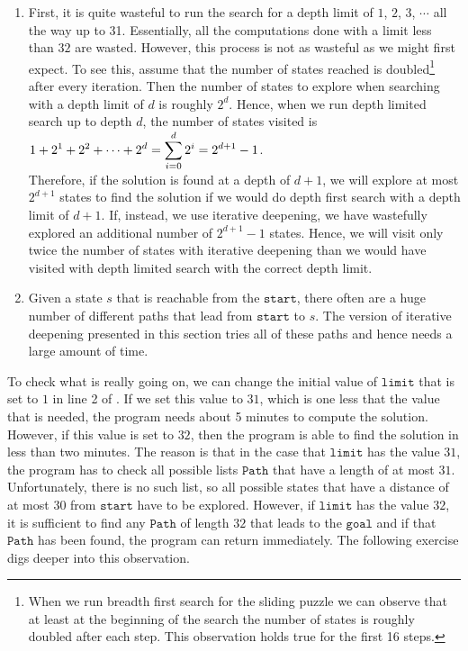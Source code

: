 \begin{enumerate}
\item First, it is quite wasteful to run the search for a depth limit of $1$, $2$, $3$, $\cdots$ all the way up
      to 31.  Essentially, all the computations done with a limit less than $32$ are wasted. However,
      this process is not as wasteful as we might first expect.  To see this, assume that the number of states
      reached is doubled\footnote{
        When we run breadth first search for the sliding puzzle we can observe that at least at the beginning
        of the search the number of states is roughly doubled after each step.  This observation holds true for
        the first 16 steps. 
      }
      after every iteration.  Then the number of states to explore when searching with a depth limit of $d$ is 
      roughly $2^d$.  Hence, when we run depth limited search up to depth $d$, the number of states visited is 
      \\[0.2cm]
      \hspace*{1.3cm}
      $\displaystyle 1 + 2^1 + 2^2 + \cdots + 2^d = \sum\limits_{i=0}^d 2^i = 2^{d+1} - 1$.
      \\[0.2cm]
      Therefore, if the solution is found at a depth of $d+1$, we will explore at most $2^{d+1}$ states to find
      the solution if we would do depth first search with a depth limit of $d+1$.  If, instead, we use
      iterative deepening, we have wastefully explored an additional number of $2^{d+1} -1$ states.  Hence, we
      will visit only twice the number of states with iterative deepening than we would have visited with depth
      limited search with the correct depth limit.
\item Given a state $s$ that is reachable from the $\texttt{start}$, there often are a huge number of
      different paths that lead from $\texttt{start}$ to $s$.  The version of iterative deepening presented in
      this section tries all of these paths and hence needs a large amount of time.
\end{enumerate}
To check what is really going on, we can change the initial value of $\texttt{limit}$ that is set to $1$ in
line 2 of .  If we set this value to $31$, which is one less that the
value that is needed, the program needs about 5 minutes to compute the solution.  However, if this value is set to
$32$, then the program is able to find the solution in less than two minutes.  The reason is that in the case that 
$\texttt{limit}$ has the value $31$, the program has to check all possible lists $\texttt{Path}$ that have a
length of at most $31$.  Unfortunately, there is no such list, so all possible states that have a distance of
at most $30$ from $\texttt{start}$ have to be explored. However, if $\texttt{limit}$ has the value $32$, it is sufficient to find any
$\texttt{Path}$ of length $32$ that leads to the $\texttt{goal}$ and if that $\texttt{Path}$ has been found, the
program can return immediately.  The following exercise digs deeper into this observation.

